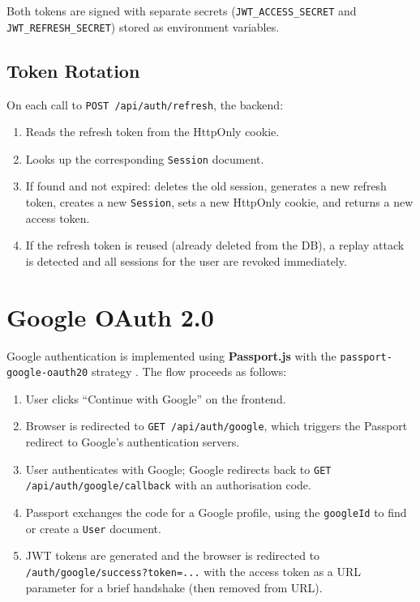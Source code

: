 Both tokens are signed with separate secrets (\texttt{JWT\_ACCESS\_SECRET} and \texttt{JWT\_REFRESH\_SECRET}) stored as environment variables.

\subsection{Token Rotation}

On each call to \texttt{POST /api/auth/refresh}, the backend:

\begin{enumerate}
  \item Reads the refresh token from the HttpOnly cookie.
  \item Looks up the corresponding \texttt{Session} document.
  \item If found and not expired: deletes the old session, generates a new refresh token, creates a new \texttt{Session}, sets a new HttpOnly cookie, and returns a new access token.
  \item If the refresh token is reused (already deleted from the DB), a replay attack is detected and all sessions for the user are revoked immediately.
\end{enumerate}

\section{Google OAuth 2.0}

Google authentication is implemented using \textbf{Passport.js} \cite{passport2024} with the \texttt{passport-google-oauth20} strategy \cite{oauth2}. The flow proceeds as follows:

\begin{enumerate}
  \item User clicks ``Continue with Google'' on the frontend.
  \item Browser is redirected to \texttt{GET /api/auth/google}, which triggers the Passport redirect to Google's authentication servers.
  \item User authenticates with Google; Google redirects back to \texttt{GET /api/auth/google/callback} with an authorisation code.
  \item Passport exchanges the code for a Google profile, using the \texttt{googleId} to find or create a \texttt{User} document.
  \item JWT tokens are generated and the browser is redirected to \texttt{/auth/google/success?token=...} with the access token as a URL parameter for a brief handshake (then removed from URL).
\end{enumerate}

